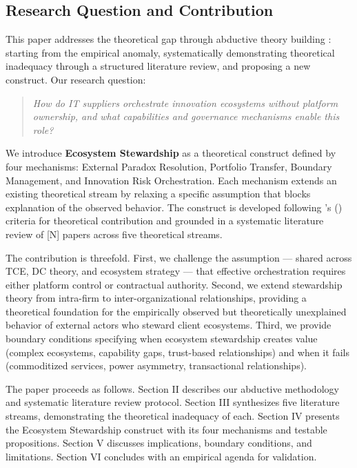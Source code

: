 \subsection{Research Question and Contribution}

This paper addresses the theoretical gap through abductive theory building \citep{DuboisGadde2002}: starting from the empirical anomaly, systematically demonstrating theoretical inadequacy through a structured literature review, and proposing a new construct. Our research question:

\begin{quote}
\emph{How do IT suppliers orchestrate innovation ecosystems without platform ownership, and what capabilities and governance mechanisms enable this role?}
\end{quote}

We introduce \textbf{Ecosystem Stewardship} as a theoretical construct defined by four mechanisms: External Paradox Resolution, Portfolio Transfer, Boundary Management, and Innovation Risk Orchestration. Each mechanism extends an existing theoretical stream by relaxing a specific assumption that blocks explanation of the observed behavior. The construct is developed following \citeauthor{Whetten1989}'s (\citeyear{Whetten1989}) criteria for theoretical contribution and grounded in a systematic literature review of [N] papers across five theoretical streams.

The contribution is threefold. First, we challenge the assumption --- shared across TCE, DC theory, and ecosystem strategy --- that effective orchestration requires either platform control or contractual authority. Second, we extend stewardship theory from intra-firm to inter-organizational relationships, providing a theoretical foundation for the empirically observed but theoretically unexplained behavior of external actors who steward client ecosystems. Third, we provide boundary conditions specifying when ecosystem stewardship creates value (complex ecosystems, capability gaps, trust-based relationships) and when it fails (commoditized services, power asymmetry, transactional relationships).

The paper proceeds as follows. Section II describes our abductive methodology and systematic literature review protocol. Section III synthesizes five literature streams, demonstrating the theoretical inadequacy of each. Section IV presents the Ecosystem Stewardship construct with its four mechanisms and testable propositions. Section V discusses implications, boundary conditions, and limitations. Section VI concludes with an empirical agenda for validation.
